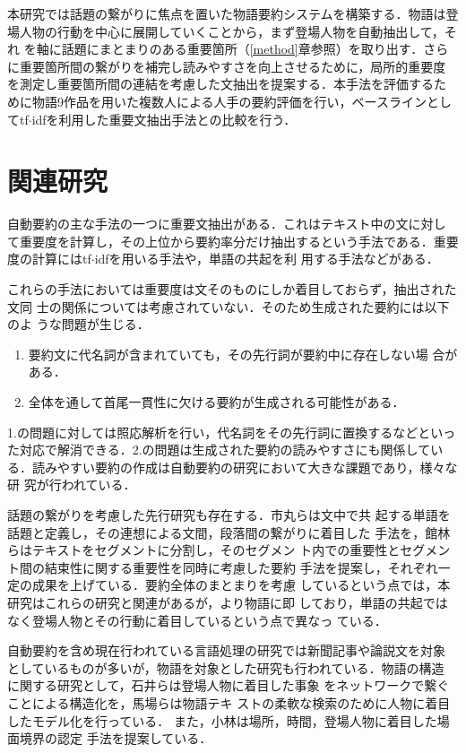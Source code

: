 \documentclass[japanese]{jnlp_1.4}
\begin{document}
 

 本研究では話題の繋がりに焦点を置いた物語要約システムを構築する．物語は登
 場人物の行動を中心に展開していくことから，まず登場人物を自動抽出して，それ
 を軸に話題にまとまりのある重要箇所（\ref{method}章参照）を取り出す．さら
 に重要箇所間の繋がりを補完し読みやすさを向上させるために，局所的重要度
 を測定し重要箇所間の連結を考慮した文抽出を提案する．本手法を評価するた
 めに物語9作品を用いた複数人による人手の要約評価を行い，ベースラインとし
 てtf$\cdot$idfを利用した重要文抽出手法との比較を行う．

 \section{関連研究}\label{related}

 自動要約の主な手法の一つに重要文抽出がある．これはテキスト中の文に対し
 て重要度を計算し，その上位から要約率分だけ抽出するという手法である．重要度の計算にはtf$\cdot$idfを用いる手法\cite{hirao2001}や，単語の共起を利
 用する手法\cite{sunayama2000}などがある．
 
 これらの手法においては重要度は文そのものにしか着目しておらず，抽出された文同
 士の関係については考慮されていない．そのため生成された要約には以下のよ
 うな問題が生じる\cite{okumura}．
 \begin{enumerate}
  \item 要約文に代名詞が含まれていても，その先行詞が要約中に存在しない場
	合がある．
  \item 全体を通して首尾一貫性に欠ける要約が生成される可能性がある．
 \end{enumerate}

 1.の問題に対しては照応解析を行い，代名詞をその先行詞に置換するなどといっ
 た対応で解消できる．2.の問題は生成された要約の読みやすさにも関係してい
 る．読みやすい要約の作成は自動要約の研究において大きな課題であり，様々な研
 究が行われている．

 話題の繋がりを考慮した先行研究も存在する．市丸ら\cite{itimaru2005}は文中で共
 起する単語を話題と定義し，その連想による文間，段落間の繋がりに着目した
 手法を，館林ら\cite{tatebayasi2006}はテキストをセグメントに分割し，そのセグメン
 ト内での重要性とセグメント間の結束性に関する重要性を同時に考慮した要約
 手法を提案し，それぞれ一定の成果を上げている．要約全体のまとまりを考慮
 しているという点では，本研究はこれらの研究と関連があるが，より物語に即
 しており，単語の共起ではなく登場人物とその行動に着目しているという点で異なっ
 ている．

 

 自動要約を含め現在行われている言語処理の研究では新聞記事や論説文を対象
 としているものが多いが，物語を対象とした研究も行われている．物語の構造
 に関する研究として，石井ら\cite{isii2006}は登場人物に着目した事象
 をネットワークで繋ぐことによる構造化を，馬場ら\cite{baba2007}は物語テキ
 ストの柔軟な検索のために人物に着目したモデル化を行っている．
 また，小林\cite{kobayashi2007}は場所，時間，登場人物に着目した場面境界の認定
 手法を提案している．
\end{document}
